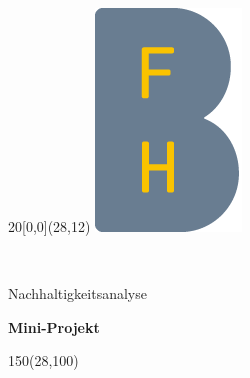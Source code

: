 %
%

\begin{titlepage}


\setlength{\unitlength}{1mm}
\begin{textblock}{20}[0,0](28,12)
	\includegraphics[scale=1.0]{bilder/BFH_Logo_B.png}
\end{textblock}
\color{black}

\begin{flushleft}

\vspace*{21mm}

\fontsize{26pt}{40pt}\selectfont 
\titel 				\\							%
\vspace{2mm}

\fontsize{16pt}{24pt}\selectfont\vspace{0.3em}
Nachhaltigkeitsanalyse \\							%
\vspace{5mm}

\fontsize{10pt}{12pt}\selectfont
\textbf{Mini-Projekt} \\									%
\vspace{7mm}

\begin{textblock}{150}(28,100)
\fontsize{10pt}{12pt}\selectfont


\end{textblock}
\end{flushleft}
\end{titlepage}
